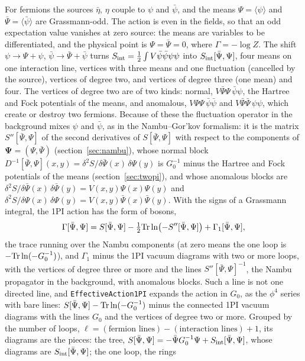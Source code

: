\documentclass[11pt,a4paper]{article}
\newcommand{\pkg}[1]{\texttt{#1}}
\newcommand{\sfieldmean}{\boldsymbol\Psi}
\begin{document}
For fermions the sources $\bar\eta$, $\eta$ couple to $\psi$ and $\bar\psi$, and the means $\Psi=\langle\psi\rangle$ and
$\bar\Psi=\langle\bar\psi\rangle$ are Grassmann-odd. The action is even in the fields, so that an odd expectation value
vanishes at zero source: the means are variables to be differentiated, and the physical point is $\Psi=\bar\Psi=0$, where
$\Gamma=-\log Z$. The shift $\psi\to\Psi+\psi$, $\bar\psi\to\bar\Psi+\bar\psi$ turns $S_{\rm int}=\frac12\int V\bar\psi\bar\psi\psi\psi$ into
$S_{\rm int}[\bar\Psi,\Psi]$, four means on one interaction line, vertices with three means and one fluctuation (cancelled by
the source), vertices of degree two, and vertices of degree three (one mean) and four. The vertices of degree two are of
two kinds: normal, $V\bar\Psi\Psi\,\bar\psi\psi$, the Hartree and Fock potentials of the means, and anomalous, $V\Psi\Psi\,
\bar\psi\bar\psi$ and $V\bar\Psi\bar\Psi\,\psi\psi$, which create or destroy two fermions. Because of these the fluctuation
operator in the background mixes $\psi$ and $\bar\psi$, as in the Nambu--Gor'kov formalism: it is the matrix $S''[\bar\Psi,\Psi]$ of the
second derivatives of $S[\bar\Psi,\Psi]$ with respect to the components of $\sfieldmean=(\Psi,\bar\Psi)$ (section~\ref{sec:nambu}), whose
normal block $D^{-1}[\bar\Psi,\Psi](x,y)=\delta^2S/\delta\bar\Psi(x)\,\delta\Psi(y)$ is $G_0^{-1}$ minus the Hartree and Fock potentials of
the means (section~\ref{sec:twopi}), and whose anomalous blocks are $\delta^2S/\delta\bar\Psi(x)\,\delta\bar\Psi(y)=V(x,y)\Psi(x)\Psi(y)$
and $\delta^2S/\delta\Psi(x)\,\delta\Psi(y)=V(x,y)\bar\Psi(x)\bar\Psi(y)$. With the signs of a Grassmann integral, the 1PI action has the
form of bosons,
\[
\Gamma[\bar\Psi,\Psi]=S[\bar\Psi,\Psi]-\tfrac12{\rm Tr}\ln\bigl(-S''[\bar\Psi,\Psi]\bigr)+\Gamma_1[\bar\Psi,\Psi],
\]
the trace running over the Nambu components (at zero means the one loop is $-{\rm Tr}\ln(-G_0^{-1})$), and $\Gamma_1$ minus the 1PI
vacuum diagrams with two or more loops, with the vertices of degree three or more and the lines $S''[\bar\Psi,\Psi]^{-1}$, the
Nambu propagator in the background, with anomalous blocks. Such a line is not one
directed line, and \pkg{EffectiveAction1PI} expands the action in $G_0$, as the $\phi^4$ series with bare lines: $S[\bar\Psi,\Psi]-{\rm
Tr}\ln(-G_0^{-1})$ minus the connected 1PI vacuum diagrams with the lines $G_0$ and the vertices of degree two or more. Grouped by
the number of loops, $\ell=(\text{fermion lines})-(\text{interaction lines})+1$, its diagrams are the pieces: the tree,
$S[\bar\Psi,\Psi]=-\bar\Psi G_0^{-1}\Psi+S_{\rm int}[\bar\Psi,\Psi]$, whose diagrams are $S_{\rm int}[\bar\Psi,\Psi]$; the one loop, the rings
\end{document}
